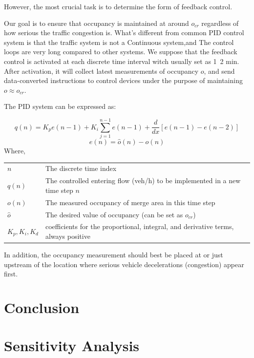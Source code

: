 \documentclass{mcmthesis}
\begin{document}
However, the most crucial task is to determine the
form of feedback control.

Our goal is to ensure that occupancy is maintained
at around $o_{cr}$ regardless of how serious the traffic congestion is.
What's different from common PID control system is that the traffic
system is not a Continuous system,and
The control loops are very long compared to other systems.
We suppose that the feedback control is activated
at each discrete time interval witch usually set as 1~2 min. After activation, it
will collect latest measurements of occupancy $o$, and
send data-converted instructions to control devices
under the purpose of maintaining $o  \approx  o_{cr}$.


The PID system can be expressed as:

  \[q\left( n \right) = K_{p}e\left( {n - 1} \right) + {K_i}\sum_{j=1}^{n-1} e\left( {n - 1} \right)+\frac{d}{dx} \left[ e\left( {n - 1} \right)-e\left( {n - 2} \right)\right]
  \]
  \[
  e\left( {n} \right)=\hat{o}\left( {n} \right)-o\left( {n} \right)
  \]
Where,

\begin{table}[htbp]
  \centering
    \begin{tabular}{ll}
      \toprule
    $n$     & The discrete time index \\
    $q(n)$  & The controlled entering flow (veh/h) to be implemented in a new time step $n$ \\

    $o(n)$ & The measured occupancy of merge area in this time step \\
    $\hat{o}$ & The desired value of occupancy (can be set as $o_{cr}$) \\
    $K_{p},K_i,K_d$  & coefficients for the proportional, integral, and derivative terms, always positive \\
    \bottomrule
    \end{tabular}%
  \label{tab:addlabel}%
\end{table}%

In addition, the occupancy measurement should best be
placed at or just upstream of the location where serious
vehicle decelerations (congestion) appear first.

\section{Conclusion}

\section{Sensitivity Analysis}
\end{document}
